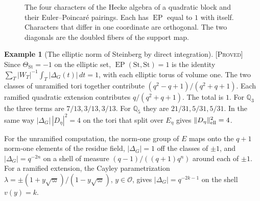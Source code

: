 \documentclass[12pt,letterpaper]{amsart}
\numberwithin{equation}{section}
\theoremstyle{definition}
\newtheorem{example}[theorem]{Example}
\theoremstyle{remark}
\newcommand{\St}{\mathrm{St}}
\newcommand{\triv}{\mathbf 1}
\newcommand{\EP}{\operatorname{EP}}
\newcommand{\Ext}{\operatorname{Ext}}
\newcommand{\status}[1]{\textup{[\textsc{#1}]}}
\begin{document}
\begin{figure}[htbp]\centering
{}
\caption{The four characters of the Hecke algebra of a quadratic block and their Euler--Poincar\'e pairings. Each has $\EP$ equal to $1$ with itself. Characters that differ in one coordinate are orthogonal. The two diagonals are the doubled fibers of the support map.}\label{fig:grid}
\end{figure}

\begin{example}[The elliptic norm of Steinberg by direct integration]\label{ex:norm}\status{Proved}
Since $\Theta_{\St}=-1$ on the elliptic set, $\EP(\St,\St)=1$ is the identity $\sum_T|W_T|^{-1}\int_T|\Delta_G(t)|\,dt=1$, with each elliptic torus of volume one. The two classes of unramified tori together contribute $(q^2-q+1)/(q^2+q+1)$. Each ramified quadratic extension contributes $q/(q^2+q+1)$. The total is $1$. For $\mathbb Q_3$ the three terms are $7/13,3/13,3/13$. For $\mathbb Q_5$ they are $21/31,5/31,5/31$. In the same way $|\Delta_G|\,|D_\eta|^2=4$ on the tori that split over $E_\eta$ gives $\|D_\eta\|^2_{\rm ell}=4$.
\end{example}
For the unramified computation, the norm-one group of $E$ maps onto the $q+1$ norm-one elements of the residue field, $|\Delta_G|=1$ off the classes of $\pm1$, and $|\Delta_G|=q^{-2n}$ on a shell of measure $(q-1)/((q+1)q^n)$ around each of $\pm1$. For a ramified extension, the Cayley parametrization $\lambda=\pm(1+y\sqrt\varpi)/(1-y\sqrt\varpi)$, $y\in\mathcal O$, gives $|\Delta_G|=q^{-2k-1}$ on the shell $v(y)=k$.
\end{document}
